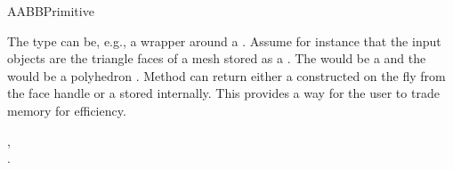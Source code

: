 \begin{ccRefConcept}{AABBPrimitive}
\ccExample

The  type can be, e.g., a wrapper around a . Assume for instance that the input objects are the triangle faces of a mesh stored as a . The  would be a  and the  would be a polyhedron . Method  can return either a  constructed on the fly from the face handle or a  stored internally. This provides a way for the user to trade memory for efficiency.

\ccHasModels
{},\\
.

\end{ccRefConcept}

\ccRefPageEnd

